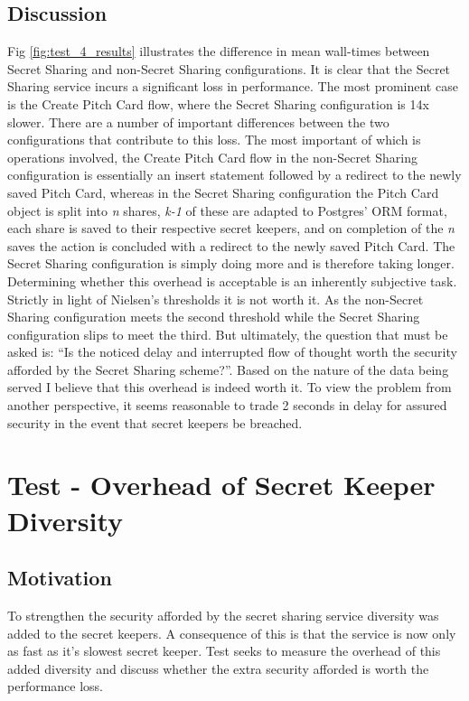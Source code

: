 \subsection{Discussion}
Fig \ref{fig:test_4_results} illustrates the difference in mean wall-times between Secret Sharing and non-Secret Sharing configurations. It is clear that the Secret Sharing service incurs a significant loss in performance. The most prominent case is the Create Pitch Card flow, where the Secret Sharing configuration is 14x slower. There are a number of important differences between the two configurations that contribute to this loss. The most important of which is operations involved, the Create Pitch Card flow in the non-Secret Sharing configuration is essentially an insert statement followed by a redirect to the newly saved Pitch Card, whereas in the Secret Sharing configuration the Pitch Card object is split into \textit{n} shares, \textit{k-1} of these are adapted to Postgres' ORM format, each share is saved to their respective secret keepers, and on completion of the \textit{n} saves the action is concluded with a redirect to the newly saved Pitch Card. The Secret Sharing configuration is simply doing more and is therefore taking longer.
Determining whether this overhead is acceptable is an inherently subjective task. Strictly in light of Nielsen's thresholds it is not worth it. As the non-Secret Sharing configuration meets the second threshold while the Secret Sharing configuration slips to meet the third. But ultimately, the question that must be asked is: ``Is the noticed delay and interrupted flow of thought worth the security afforded by the Secret Sharing scheme?''. Based on the nature of the data being served I believe that this overhead is indeed worth it. To view the problem from another perspective, it seems reasonable to trade 2 seconds in delay for assured security in the event that secret keepers be breached.

\section{Test  - Overhead of Secret Keeper Diversity}

\subsection{Motivation}
To strengthen the security afforded by the secret sharing service diversity was added to the secret keepers. A consequence of this is that the service is now only as fast as it's slowest secret keeper. Test  seeks to measure the overhead of this added diversity and discuss whether the extra security afforded is worth the performance loss.

